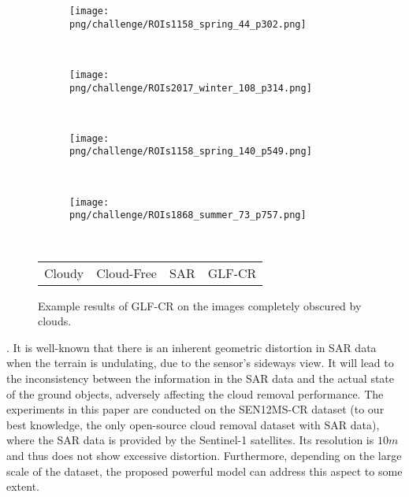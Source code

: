 \documentclass[a4paper,fleqn]{cas-dc}
\begin{document}
\begin{figure}[!t]
    \centering
    \begin{subfigure}[b]{0.48\textwidth}
     \centering
     \texttt{[image: png/challenge/ROIs1158\_spring\_44\_p302.png]}
    \end{subfigure}
    \\
    \begin{subfigure}[b]{0.48\textwidth}
     \centering
     \texttt{[image: png/challenge/ROIs2017\_winter\_108\_p314.png]}
    \end{subfigure}
    \\
    \begin{subfigure}[b]{0.48\textwidth}
     \centering
     \texttt{[image: png/challenge/ROIs1158\_spring\_140\_p549.png]}
    \end{subfigure}
    \\
    \begin{subfigure}[b]{0.48\textwidth}
     \centering
     \texttt{[image: png/challenge/ROIs1868\_summer\_73\_p757.png]}
    \end{subfigure}
    \\
    \begin{minipage}{0.48\textwidth}
    \begin{tabu} to \textwidth {X[c] X[c] X[c] X[c]}
    Cloudy & Cloud-Free & SAR & GLF-CR
    \end{tabu}
    \end{minipage}
    \caption{Example results of GLF-CR on the images completely obscured by clouds.}
    \label{fig:challenge}
    \vspace{-5mm}
\end{figure} 
.
It is well-known that there is an inherent geometric distortion in SAR data when the terrain is undulating, due to the sensor's sideways view. It will lead to the inconsistency between the information in the SAR data and the actual state of the ground objects, adversely affecting the cloud removal performance. The experiments in this paper are conducted on the SEN12MS-CR dataset (to our best knowledge, the only open-source cloud removal dataset with SAR data), where the SAR data is provided by the Sentinel-1 satellites. Its resolution is $10m$ and thus does not show excessive distortion. Furthermore, depending on the large scale of the dataset, the proposed powerful model can address this aspect to some extent. 
\end{document}
